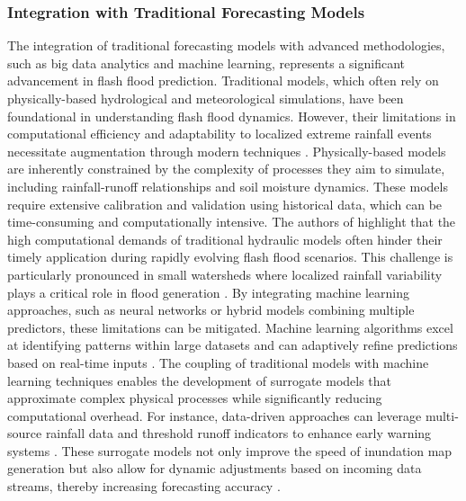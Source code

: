 \subsubsection{Integration with Traditional Forecasting Models}
The integration of traditional forecasting models with advanced methodologies, such as big data analytics and machine learning, represents a significant advancement in flash flood prediction. Traditional models, which often rely on physically-based hydrological and meteorological simulations, have been foundational in understanding flash flood dynamics. However, their limitations in computational efficiency and adaptability to localized extreme rainfall events necessitate augmentation through modern techniques \citep{Zanchetta2020}\citep{Hinge2024}.
Physically-based models are inherently constrained by the complexity of processes they aim to simulate, including rainfall-runoff relationships and soil moisture dynamics. These models require extensive calibration and validation using historical data, which can be time-consuming and computationally intensive. The authors of \citep{Zanchetta2020} highlight that the high computational demands of traditional hydraulic models often hinder their timely application during rapidly evolving flash flood scenarios. This challenge is particularly pronounced in small watersheds where localized rainfall variability plays a critical role in flood generation \citep{Lu2021}\citep{Douinot2016}.
By integrating machine learning approaches, such as neural networks or hybrid models combining multiple predictors, these limitations can be mitigated. Machine learning algorithms excel at identifying patterns within large datasets and can adaptively refine predictions based on real-time inputs \citep{Hinge2024}. The coupling of traditional models with machine learning techniques enables the development of surrogate models that approximate complex physical processes while significantly reducing computational overhead. For instance, data-driven approaches can leverage multi-source rainfall data and threshold runoff indicators to enhance early warning systems \citep{Liu2018}. These surrogate models not only improve the speed of inundation map generation but also allow for dynamic adjustments based on incoming data streams, thereby increasing forecasting accuracy \citep{Zanchetta2020}\citep{Liu2018}.
